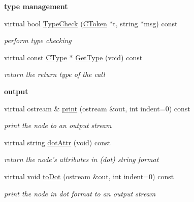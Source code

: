 \begin{Indent}{\bf type management}\par
\begin{DoxyCompactItemize}
\item 
virtual bool \hyperlink{classCAstFunctionCall_a74e4ab38c0fd01dcfe8817ad4158e91d}{Type\-Check} (\hyperlink{classCToken}{C\-Token} $\ast$t, string $\ast$msg) const 
\begin{DoxyCompactList}\small\item\em perform type checking \end{DoxyCompactList}\item 
\hypertarget{classCAstFunctionCall_ac724e5be1d6aa8d8871e1ae6c36f8c37}{virtual const \hyperlink{classCType}{C\-Type} $\ast$ \hyperlink{classCAstFunctionCall_ac724e5be1d6aa8d8871e1ae6c36f8c37}{Get\-Type} (void) const }\label{classCAstFunctionCall_ac724e5be1d6aa8d8871e1ae6c36f8c37}

\begin{DoxyCompactList}\small\item\em return the return type of the call \end{DoxyCompactList}\end{DoxyCompactItemize}
\end{Indent}
\begin{Indent}{\bf output}\par
\begin{DoxyCompactItemize}
\item 
virtual ostream \& \hyperlink{classCAstFunctionCall_a131bde5f7a313c322a91e770c052b4a0}{print} (ostream \&out, int indent=0) const 
\begin{DoxyCompactList}\small\item\em print the node to an output stream \end{DoxyCompactList}\item 
virtual string \hyperlink{classCAstFunctionCall_abc5d52d36e580e3046fd4cbc95492171}{dot\-Attr} (void) const 
\begin{DoxyCompactList}\small\item\em return the node's attributes in (dot) string format \end{DoxyCompactList}\item 
virtual void \hyperlink{classCAstFunctionCall_af360576556dd94cb28d748061c40742f}{to\-Dot} (ostream \&out, int indent=0) const 
\begin{DoxyCompactList}\small\item\em print the node in dot format to an output stream \end{DoxyCompactList}\end{DoxyCompactItemize}
\end{Indent}
